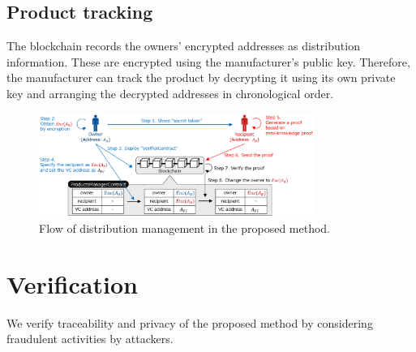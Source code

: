 \documentclass[conference]{IEEEtran}
\begin{document}
\subsection{Product tracking}
The blockchain records the owners'  encrypted  addresses as distribution information.
These are encrypted using the manufacturer's public key.
Therefore, the manufacturer can track the product by decrypting it using its own private key and arranging the decrypted addresses in chronological order.


\begin{figure}[t]
    \centering
    \includegraphics[width=0.8\textwidth]{flow.eps}
    \caption{Flow of distribution management in the proposed method.
    \label{fig:flow-ProposedMethod}}
\end{figure}


\section{Verification}
\label{sec:verification}
We verify traceability and privacy of the proposed method by considering fraudulent activities by attackers.
\end{document}
